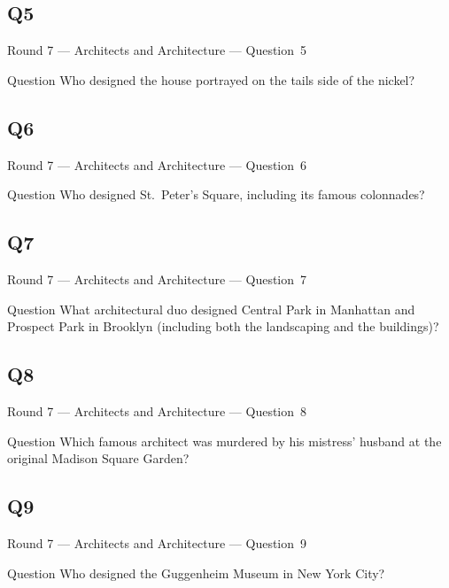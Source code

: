 \documentclass[11pt]{beamer}
\begin{document}
\subsection*{Q5}
\begin{frame}[t]{Round 7 --- Architects and Architecture --- \mbox{Question 5}}
\vspace{-0.5em}
\begin{block}{Question}
Who designed the house portrayed on the tails side of the nickel?
\end{block}
\end{frame}
\subsection*{Q6}
\begin{frame}[t]{Round 7 --- Architects and Architecture --- \mbox{Question 6}}
\vspace{-0.5em}
\begin{block}{Question}
Who designed St.\ Peter's Square, including its famous colonnades?
\end{block}
\end{frame}
\subsection*{Q7}
\begin{frame}[t]{Round 7 --- Architects and Architecture --- \mbox{Question 7}}
\vspace{-0.5em}
\begin{block}{Question}
What architectural duo designed Central Park in Manhattan and Prospect Park in Brooklyn (including both the landscaping and the buildings)? 
\end{block}
\end{frame}
\subsection*{Q8}
\begin{frame}[t]{Round 7 --- Architects and Architecture --- \mbox{Question 8}}
\vspace{-0.5em}
\begin{block}{Question}
Which famous architect was murdered by his mistress' husband at the original Madison Square Garden?
\end{block}
\end{frame}
\subsection*{Q9}
\begin{frame}[t]{Round 7 --- Architects and Architecture --- \mbox{Question 9}}
\vspace{-0.5em}
\begin{block}{Question}
Who designed the Guggenheim Museum in New York City?
\end{block}
\end{frame}
\end{document}
